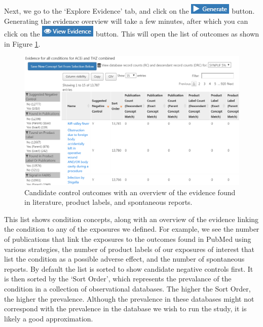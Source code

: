 \documentclass[]{book}
\begin{document}
Next, we go to the `Explore Evidence' tab, and click on the
\includegraphics{images/MethodValidity/generate.png} button. Generating
the evidence overview will take a few minutes, after which you can click
on the \includegraphics{images/MethodValidity/viewEvidence.png} button.
This will open the list of outcomes as shown in Figure
\ref{fig:candidateNcs}.

\begin{figure}

{\centering \includegraphics[width=1\linewidth]{images/MethodValidity/candidateNcs} 

}

\caption{Candidate control outcomes with an overview of the evidence found in literature, product labels, and spontaneous reports.}\label{fig:candidateNcs}
\end{figure}

This list shows condition concepts, along with an overview of the
evidence linking the condition to any of the exposures we defined. For
example, we see the number of publications that link the exposures to
the outcomes found in PubMed using various strategies, the number of
product labels of our exposures of interest that list the condition as a
possible adverse effect, and the number of spontaneous reports. By
default the list is sorted to show candidate negative controls first. It
is then sorted by the `Sort Order', which represents the prevalance of
the condition in a collection of observational databases. The higher the
Sort Order, the higher the prevalence. Although the prevalence in these
databases might not correspond with the prevalence in the database we
wish to run the study, it is likely a good approximation.
\end{document}
